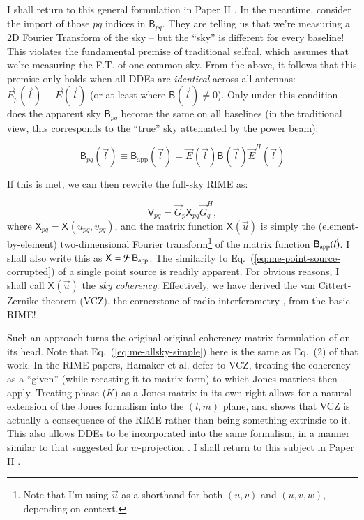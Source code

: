\documentclass{aa}
\newcommand{\herm}{H}
\newcommand{\jones}[2]{\vec {#1}_{#2}}
\newcommand{\jonesT}[2]{\vec {#1}^{\herm}_{#2}}
\newcommand{\coh}[2]{\mathsf{{#1}}_{{#2}}}
\begin{document}
I shall return to this general formulation in Paper II \citep{RRIME2}. In the meantime, consider the import of those $pq$ indices in $\coh{B}{pq}$. They are telling us that we're measuring a 2D Fourier Transform of the sky -- but the ``sky'' is different for every baseline! This violates the fundamental premise of traditional selfcal, which assumes that we're measuring the F.T. of one common sky. From the above, it follows that this premise only holds when all DDEs are \emph{identical} across all antennas: $\jones{E}{p}(\vec l) \equiv \jones{E}{}(\vec l)$ (or at least where $\coh{B}{}(\vec l) \ne 0$). Only under this condition does the apparent sky $\coh{B}{pq}$ become the same on all baselines (in the traditional view, this corresponds to the ``true'' sky attenuated by the power beam):

\[
\coh{B}{pq}(\vec l) \equiv \coh{B}{\mathrm{app}}(\vec l) =  \jones{E}{}(\vec l) \coh{B}{}(\vec l) \jonesT{E}{}(\vec l)
\]

If this is met, we can then rewrite the full-sky RIME as:

\begin{equation}\label{eq:me-allsky-simple}
\coh{V}{pq} = \jones{G}{p} \coh{X}{pq} \jonesT{G}{q},
\end{equation}
where $\coh{X}{pq} = \coh{X}{}(u_{pq},v_{pq})$, and the matrix function $\coh{X}{}(\vec u)$ is simply the (element-by-element) two-dimensional Fourier transform\footnote{Note that I'm using $\vec u$ as a shorthand for both $(u,v)$ and $(u,v,w)$, depending on context.}
of the matrix function $\coh{B}{\rm app}(\vec l)$. I shall also write this as $\coh{X}{}={\cal F}\coh{B}{\mathrm{app}}$. The similarity to Eq.~(\ref{eq:me-point-source-corrupted}) of a single point source is readily apparent. For obvious reasons, I shall call $\coh{X}{}(\vec u)$ the {\em sky coherency}. Effectively, we have derived the van Cittert-Zernike theorem (VCZ), the cornerstone of radio interferometry \citep[Sect.~14.1]{tms}, from the basic RIME! 

Such an approach turns the original original coherency matrix formulation of \citet{ME4} on its head. Note that Eq.~(\ref{eq:me-allsky-simple}) here is the same as Eq.~(2) of that work. In the RIME papers, Hamaker et al. defer to VCZ, treating the coherency as a ``given'' (while recasting it to matrix form) to which Jones matrices then apply. Treating phase ($K$) as a Jones matrix in its own right \citep{JEN:note185} allows for a natural extension of the Jones formalism into the $(l,m)$ plane, and shows that VCZ is actually a consequence of the RIME rather than being something extrinsic to it. This also allows DDEs to be incorporated into the same formalism, in a manner similar to that suggested for $w$-projection \citep{Cornwell:wproj}. I shall return to this subject in Paper II \citep{RRIME2}.
\end{document}

